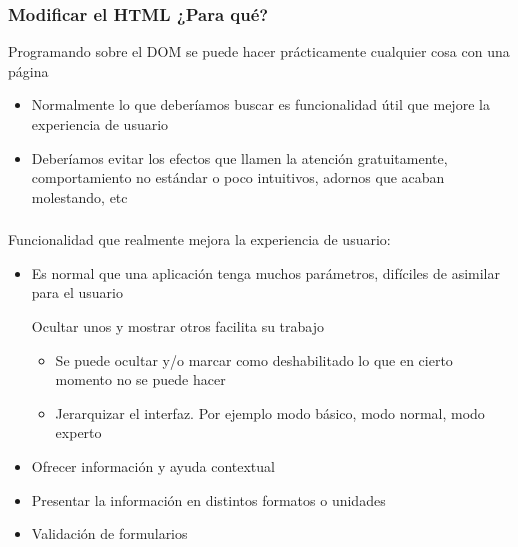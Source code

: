 \documentclass[ucs]{beamer}
\begin{document}
\begin{frame}[fragile]
\frametitle{Modificar el HTML ¿Para qué?}

Programando sobre el DOM se puede hacer prácticamente cualquier cosa con una
página

\begin{itemize}
\item
Normalmente lo que deberíamos buscar es
funcionalidad útil que mejore la experiencia de usuario

\item
Deberíamos evitar los
efectos
que llamen la atención gratuitamente, comportamiento no estándar o poco intuitivos,
adornos que acaban molestando, etc
\end{itemize}

\end{frame}



\begin{frame}[fragile]
\frametitle{}
Funcionalidad que realmente mejora la experiencia de usuario:
\begin{itemize}
\item
Es normal que una aplicación tenga muchos parámetros, difíciles
de asimilar para el usuario

Ocultar unos y mostrar otros facilita su trabajo


\begin{itemize}
    \item
Se puede ocultar y/o marcar como deshabilitado lo que en cierto momento no se puede hacer
    \item
Jerarquizar el interfaz. Por ejemplo modo básico, modo normal, modo experto
\end{itemize}

    \item
Ofrecer información y ayuda contextual

    \item
Presentar la información en distintos formatos o unidades

    \item
Validación de formularios 



\end{itemize}

\end{frame}
\end{document}
